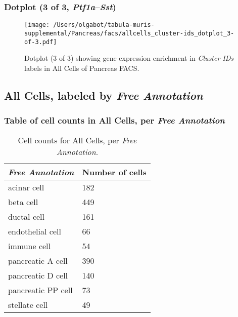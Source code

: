 \clearpage

\subsubsection{Dotplot (3 of 3, \emph{Ptf1a}--\emph{Sst})}
\begin{figure}[h]
\centering
\texttt{[image: /Users/olgabot/tabula-muris-supplemental/Pancreas/facs/allcells\_cluster-ids\_dotplot\_3-of-3.pdf]}

\caption{ Dotplot (3 of 3)  showing gene expression enrichment in \emph{Cluster IDs} labels in All Cells of Pancreas FACS. }
\end{figure}


\clearpage

\subsection{All Cells, labeled by \emph{Free Annotation}}
\subsubsection{Table of cell counts in All Cells, per \emph{Free Annotation}}\begin{table}[h]
\centering
\label{my-label}
\begin{tabular}{@{}ll@{}}
\toprule

\emph{Free Annotation}& Number of cells \\ \midrule
acinar cell & 182 \\

beta cell & 449 \\

ductal cell & 161 \\

endothelial cell & 66 \\

immune cell & 54 \\

pancreatic A cell & 390 \\

pancreatic D cell & 140 \\

pancreatic PP cell & 73 \\

stellate cell & 49 \\
\bottomrule
\end{tabular}
\caption{Cell counts for All Cells, per \emph{Free Annotation}.}
\end{table}

